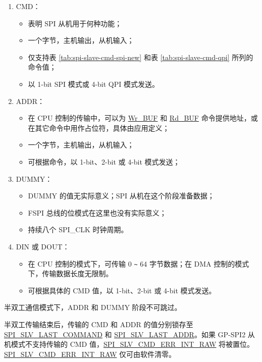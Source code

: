 \documentclass[main\_\_CN.tex]{subfiles}
\begin{document}
\begin{enumerate}
   \item CMD：
        \begin{itemize}
            \item 表明 SPI 从机用于何种功能；
            \item 一个字节，主机输出，从机输入；
            \item 仅支持表 \ref{tab:spi-slave-cmd-spi-new} 和表 \ref{tab:spi-slave-cmd-qpi} 所列的命令值；
            \item 以 1-bit SPI 模式或 4-bit QPI 模式发送。
        \end{itemize}

   \item ADDR：
        \begin{itemize}
            \item 在 CPU 控制的传输中，可以为  \hyperlink{cmd:wrbuf}{Wr\_BUF} 和  \hyperlink{cmd:rdbuf}{Rd\_BUF} 命令提供地址，或在其它命令中用作占位符，具体由应用定义；
            \item 一个字节，主机输出，从机输入；
            \item 可根据命令，以 1-bit、2-bit 或 4-bit 模式发送；
        \end{itemize}

   \item DUMMY：
        \begin{itemize}
            \item DUMMY 的值无实际意义；SPI 从机在这个阶段准备数据；
            \item FSPI 总线的位模式在这里也没有实际意义；
            \item 持续八个 SPI\_CLK 时钟周期。
        \end{itemize}

   \item DIN 或 DOUT：

        \begin{itemize}
            \item 在 CPU 控制的模式下，可传输 0 \verb+~+ 64 字节数据；在 DMA 控制的模式下，传输数据长度无限制。
            \item 可根据具体的 CMD 值，以 1-bit、2-bit 或 4-bit 模式发送。
        \end{itemize}

   \end{enumerate}

\begin{tiplisting}
半双工通信模式下，ADDR 和 DUMMY 阶段不可跳过。
\end{tiplisting}
\vspace{-1em}
半双工传输结束后，传输的 CMD 和 ADDR 的值分别锁存至 \hyperref[fielddesc:SPISLVLASTCOMMAND]{SPI\_SLV\_LAST\_COMMAND} 和 \hyperref[fielddesc:SPISLVLASTADDR]{SPI\_SLV\_LAST\_ADDR}。如果 GP-SPI2 从机模式不支持传输的 CMD 值，\hyperref[fielddesc:SPISLVCMDERRINTRAW]{SPI\_SLV\_CMD\_ERR\_INT\_RAW} 将被置位。 \hyperref[fielddesc:SPISLVCMDERRINTRAW]{SPI\_SLV\_CMD\_ERR\_INT\_RAW} 仅可由软件清零。
\end{document}

